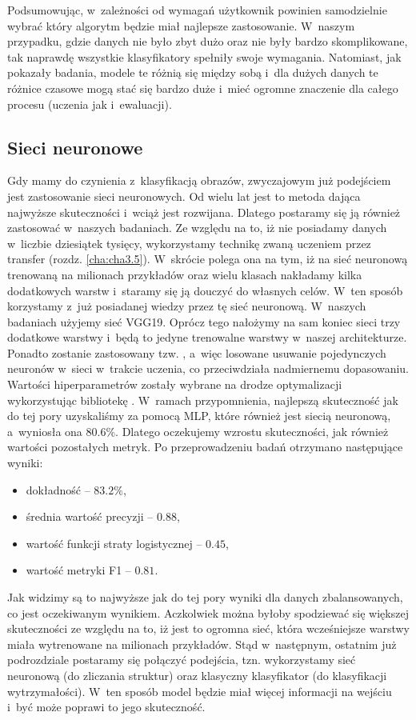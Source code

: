 Podsumowując, w~zależności od wymagań użytkownik powinien samodzielnie wybrać który algorytm będzie miał najlepsze zastosowanie. W~naszym przypadku, gdzie danych nie było zbyt dużo oraz nie były bardzo skomplikowane, tak naprawdę wszystkie klasyfikatory spełniły swoje wymagania. Natomiast, jak pokazały badania, modele te różnią się między sobą i~dla dużych danych te różnice czasowe mogą stać się bardzo duże i~mieć ogromne znaczenie dla całego procesu (uczenia jak i~ewaluacji).

\subsection{Sieci neuronowe}
\label{binary.ann.with.structures}

Gdy mamy do czynienia z~klasyfikacją obrazów, zwyczajowym już podejściem jest zastosowanie sieci neuronowych. Od wielu lat jest to metoda dająca najwyższe skuteczności i~wciąż jest rozwijana. Dlatego postaramy się ją również zastosować w~naszych badaniach. Ze względu na to, iż nie posiadamy danych w~liczbie dziesiątek tysięcy, wykorzystamy technikę zwaną uczeniem przez transfer (rozdz. \ref{cha:cha3.5}). W~skrócie polega ona na tym, iż na sieć neuronową trenowaną na milionach przykładów oraz wielu klasach nakładamy kilka dodatkowych warstw i~staramy się ją douczyć do własnych celów. W~ten sposób korzystamy z~już posiadanej wiedzy przez tę sieć neuronową. W~naszych badaniach użyjemy sieć VGG19. Oprócz tego nałożymy na sam koniec sieci trzy dodatkowe warstwy i~będą to jedyne trenowalne warstwy w~naszej architekturze. Ponadto zostanie zastosowany tzw. , a~więc losowane usuwanie pojedynczych neuronów w~sieci w~trakcie uczenia, co przeciwdziała nadmiernemu dopasowaniu. Wartości hiperparametrów zostały wybrane na drodze optymalizacji wykorzystując bibliotekę . W~ramach przypomnienia, najlepszą skuteczność jak do tej pory uzyskaliśmy za pomocą MLP, które również jest siecią neuronową, a~wyniosła ona $80.6\%$. Dlatego oczekujemy wzrostu skuteczności, jak również wartości pozostałych metryk. 
Po przeprowadzeniu badań otrzymano następujące wyniki:
\begin{itemize}
	\item dokładność – $83.2\%$,
	\item średnia wartość precyzji – $0.88$,
	\item wartość funkcji straty logistycznej – $0.45$,
	\item wartość metryki F1 – $0.81$.
\end{itemize}
Jak widzimy są to najwyższe jak do tej pory wyniki dla danych zbalansowanych, co jest oczekiwanym wynikiem. Aczkolwiek można byłoby spodziewać się większej skuteczności ze względu na to, iż jest to ogromna sieć, która wcześniejsze warstwy miała wytrenowane na milionach przykładów. Stąd w~następnym, ostatnim już podrozdziale postaramy się połączyć podejścia, tzn. wykorzystamy sieć neuronową (do zliczania struktur) oraz klasyczny klasyfikator (do klasyfikacji wytrzymałości). W~ten sposób model będzie miał więcej informacji na wejściu i~być może poprawi to jego skuteczność. 


